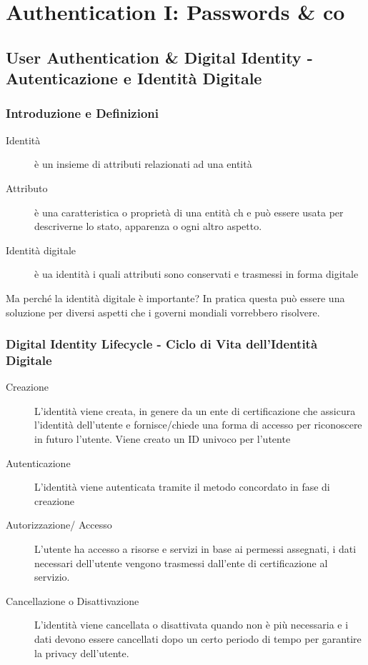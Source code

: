 \chapter{Authentication I: Passwords \& co}
\thispagestyle{chapterInit}
\section{User Authentication \& Digital Identity - Autenticazione e Identità Digitale}
    \subsection{Introduzione e Definizioni}
        \begin{description}
            \item[Identità] è un insieme di attributi relazionati ad una entità
            \item[Attributo] è una caratteristica o proprietà di una entità ch e può essere usata per descriverne lo stato, apparenza o ogni altro aspetto.  
            \item[Identità digitale] è ua identità i quali attributi sono conservati e trasmessi in forma digitale 
        \end{description}
        Ma perché la identità digitale è importante? In pratica questa può essere una soluzione per diversi aspetti che i governi mondiali vorrebbero risolvere.
    \subsection{Digital Identity Lifecycle - Ciclo di Vita dell'Identità Digitale}
        \begin{description}
            \item[Creazione] L'identità viene creata, in genere da un ente di certificazione che assicura l'identità dell'utente e fornisce/chiede una forma di accesso per riconoscere in futuro l'utente. Viene creato un ID univoco per l'utente
            \item[Autenticazione] L'identità viene autenticata tramite il metodo concordato in fase di creazione
            \item[Autorizzazione/ Accesso] L'utente ha accesso a risorse e servizi in base ai permessi assegnati, i dati necessari dell'utente vengono trasmessi dall'ente di certificazione al servizio.
            \item[Cancellazione o Disattivazione] L'identità viene cancellata o disattivata quando non è più necessaria e i dati devono essere cancellati dopo un certo periodo di tempo per garantire la privacy dell'utente.
        \end{description}

